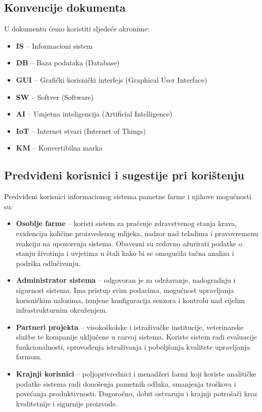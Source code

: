 \documentclass{article}
\begin{document}
\subsection{Konvencije dokumenta}
U dokumentu ćemo koristiti sljedeće akronime:

\begin{itemize}
 \item \textbf{IS} – Informacioni sistem
 \item \textbf{DB} – Baza podataka (Database)
 \item \textbf{GUI} – Grafički korisnički interfejs (Graphical User Interface)
 \item \textbf{SW} – Softver (Software)
 \item \textbf{AI} – Umjetna inteligencija (Artificial Intelligence)
 \item \textbf{IoT} – Internet stvari (Internet of Things) 
 \item \textbf{KM} – Konvertibilna marka
\end{itemize}

\subsection{Predviđeni korisnici i sugestije pri korištenju}

Predviđeni korisnici informacionog sistema pametne farme i njihove mogućnosti su:

\begin{itemize}
 \item \textbf{Osoblje farme} – koristi sistem za praćenje zdravstvenog stanja krava, evidenciju količine proizvedenog mlijeka, nadzor nad teladima i pravovremenu reakciju na upozorenja sistema. Obavezni su redovno ažurirati podatke o stanju životinja i uvjetima u štali kako bi se omogućila tačna analiza i podrška odlučivanju.

\item \textbf{Administrator sistema} – odgovoran je za održavanje, nadogradnju i sigurnost sistema. Ima pristup svim podacima, mogućnost upravljanja korisničkim nalozima, izmjene konfiguracija senzora i kontrolu nad cijelim infrastrukturnim okruženjem.

 \item \textbf{Partneri projekta} – visokoškolske i istraživačke institucije, veterinarske službe te kompanije uključene u razvoj sistema. Koriste sistem radi evaluacije funkcionalnosti, sprovođenja istraživanja i poboljšanja kvalitete upravljanja farmom.

 \item \textbf{Krajnji korisnici} – poljoprivrednici i menadžeri farmi koji koriste analitičke podatke sistema radi donošenja pametnih odluka, smanjenja troškova i povećanja produktivnosti. Dugoročno, dobit ostvaruju i krajnji potrošači kroz kvalitetnije i sigurnije proizvode.
\end{itemize}
\end{document}
